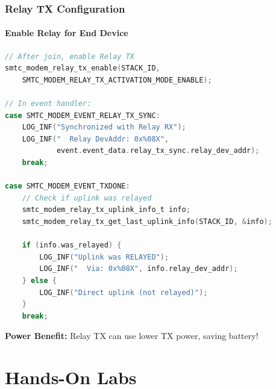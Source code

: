 \documentclass{beamer}
\begin{document}
\begin{frame}[fragile]
\frametitle{Relay TX Configuration}
\framesubtitle{Enable Relay for End Device}

\begin{lstlisting}[language=C, basicstyle=\tiny\ttfamily]
// After join, enable Relay TX
smtc_modem_relay_tx_enable(STACK_ID,
    SMTC_MODEM_RELAY_TX_ACTIVATION_MODE_ENABLE);

// In event handler:
case SMTC_MODEM_EVENT_RELAY_TX_SYNC:
    LOG_INF("Synchronized with Relay RX");
    LOG_INF("  Relay DevAddr: 0x%08X",
            event.event_data.relay_tx_sync.relay_dev_addr);
    break;

case SMTC_MODEM_EVENT_TXDONE:
    // Check if uplink was relayed
    smtc_modem_relay_tx_uplink_info_t info;
    smtc_modem_relay_tx_get_last_uplink_info(STACK_ID, &info);

    if (info.was_relayed) {
        LOG_INF("Uplink was RELAYED");
        LOG_INF("  Via: 0x%08X", info.relay_dev_addr);
    } else {
        LOG_INF("Direct uplink (not relayed)");
    }
    break;
\end{lstlisting}

\textbf{Power Benefit:} Relay TX can use lower TX power, saving battery!
\end{frame}

\section{Hands-On Labs}
\end{document}
